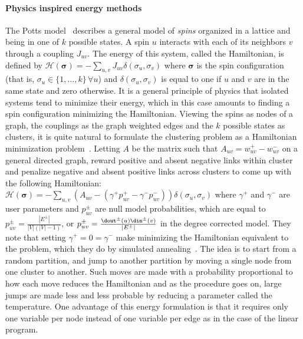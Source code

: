 \paragraph{Physics inspired energy methods}
\label{par:cc_physics}

The Potts model~\autocite{PottsSurvey82} describes a general model of \emph{spins} organized in a
lattice and being in one of $k$ possible states. A spin $u$ interacts with each of its neighbors $v$
through a coupling $J_{uv}$. The energy of this system, called the Hamiltonian, is defined by
$\mathcal{H}(\bm{\sigma}) = -\sum_{u,v} J_{uv} \delta(\sigma_u, \sigma_v)$ where $\bm{\sigma}$ is
the spin configuration (that is, $\sigma_u \in \{1,\ldots,k\}\,\forall u$) and $\delta(\sigma_u,
\sigma_v)$ is equal to one if $u$ and $v$ are in the same state and zero otherwise. It is a general
principle of physics that isolated systems tend to minimize their energy, which in this case amounts
to finding a spin configuration minimizing the Hamiltonian. Viewing the spins as nodes of a graph,
the couplings as the graph weighted edges and the $k$ possible states as clusters, it is quite
natural to formulate the clustering problem as a Hamiltonian minimization
problem~\autocite{CommunityPhysics06}. Letting $A$ be the matrix such that $A_{uv} = w_{uv}^+ -
w_{uv}^-$ on a general directed graph, \textcite{Traag2009} reward positive and absent negative
links within cluster and penalize negative and absent positive links across clusters to come up with
the following Hamiltonian: $\mathcal{H}(\bm{\sigma}) = -\sum_{u,v} \left(A_{uv}-(\gamma^+p^+_{uv} -
\gamma^-p^-_{uv})\right) \delta(\sigma_u, \sigma_v)$ where $\gamma^+$ and $\gamma^-$ are user
parameters and $p^\pm_{uv}$ are null model probabilities, which are equal to $p^\pm_{uv} =
\frac{|E^\pm|}{|V|(|V|-1)}$, or $p^\pm_{uv}=\frac{\dout^\pm(u) \din^\pm(v)}{|E^\pm|}$ in the degree
corrected model. They note that setting $\gamma^+ = 0 = \gamma^-$ make minimizing the Hamiltonian
equivalent to the \mind{} problem, which they do by simulated
annealing~\autocite{SimulatedAnnealing83}. The idea is to start from a random partition, and jump to
another partition by moving a single node from one cluster to another. Such moves are made with a
probability proportional to how each move reduces the Hamiltonian and as the procedure goes on, large
jumps are made less and less probable by reducing a parameter called the temperature.
One advantage of this energy formulation is that it requires only one variable per node instead of
one variable per edge as in the case of the linear program.

